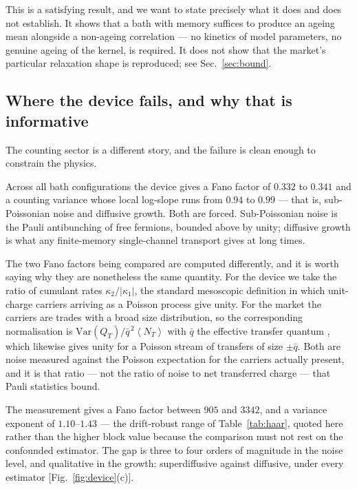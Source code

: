 \documentclass[aps,pre,twocolumn,superscriptaddress,floatfix,nofootinbib]{revtex4-2}
\newcommand{\avg}[1]{\left\langle #1 \right\rangle}
\newcommand{\Var}{\mathrm{Var}}
\begin{document}
This is a satisfying result, and we want to state precisely what it does and does
not establish. It shows that a bath with memory suffices to produce an ageing
mean alongside a non-ageing correlation --- no kinetics of model parameters, no
genuine ageing of the kernel, is required. It does not show that the market's
particular relaxation shape is reproduced; see Sec.~\ref{sec:bound}.

\subsection{Where the device fails, and why that is informative}
\label{sec:gap}

The counting sector is a different story, and the failure is clean enough to
constrain the physics.

Across all bath configurations the device gives a Fano factor of $0.332$ to
$0.341$ and a counting variance whose local log-slope runs from $0.94$ to
$0.99$ --- that is, sub-Poissonian noise and diffusive growth. Both are forced.
Sub-Poissonian noise is the Pauli antibunching of free fermions, bounded above
by unity; diffusive growth is what any finite-memory single-channel transport
gives at long times.

The two Fano factors being compared are computed differently, and it is worth
saying why they are nonetheless the same quantity. For the device we take the
ratio of cumulant rates $\kappa_2/|\kappa_1|$, the standard mesoscopic
definition in which unit-charge carriers arriving as a Poisson process give
unity. For the market the carriers are trades with a broad size distribution,
so the corresponding normalisation is
$\Var(Q_T)/\bar q^{\,2}\avg{N_T}$ with $\bar q$ the effective transfer quantum
\cite{paper1}, which likewise gives unity for a Poisson stream of transfers of
size $\pm\bar q$. Both are noise measured against the Poisson expectation for
the carriers actually present, and it is that ratio --- not the ratio of noise
to net transferred charge --- that Pauli statistics bound.

The measurement gives a Fano factor between $905$ and $3342$, and a variance
exponent of $1.10$--$1.43$ \cite{paper1} --- the drift-robust range of
Table~\ref{tab:haar}, quoted here rather than the higher block value because
the comparison must not rest on the confounded estimator. The gap is three to
four orders of magnitude in the noise level, and qualitative in the growth:
superdiffusive against diffusive, under every estimator
[Fig.~\ref{fig:device}(c)].
\end{document}
